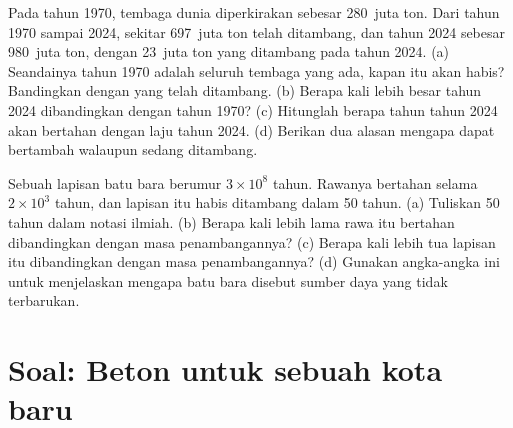 \begin{exercise}[$\star\star\star$]\label{exo:g9:earth-resources:11}
Pada tahun 1970,  tembaga dunia diperkirakan sebesar 280~juta ton.
Dari tahun 1970 sampai 2024, sekitar 697~juta ton telah ditambang, dan
 tahun 2024 sebesar 980~juta ton, dengan 23~juta ton yang
ditambang pada tahun 2024. (a) Seandainya  tahun 1970 adalah
seluruh tembaga yang ada, kapan  itu akan habis? Bandingkan
dengan yang telah ditambang. (b) Berapa kali lebih besar  tahun
2024 dibandingkan dengan  tahun 1970? (c) Hitunglah berapa tahun
 tahun 2024 akan bertahan dengan laju tahun 2024. (d) Berikan dua
alasan mengapa  dapat bertambah walaupun sedang ditambang.
\end{exercise}

\begin{exercise}[$\star\star\star$]\label{exo:g9:earth-resources:12}
Sebuah lapisan batu bara berumur $3 \times 10^8$ tahun. Rawanya bertahan
selama $2 \times 10^3$ tahun, dan lapisan itu habis ditambang dalam 50
tahun. (a) Tuliskan 50 tahun dalam notasi ilmiah. (b) Berapa kali lebih
lama rawa itu bertahan dibandingkan dengan masa penambangannya? (c) Berapa
kali lebih tua lapisan itu dibandingkan dengan masa penambangannya?
(d) Gunakan angka-angka ini untuk menjelaskan mengapa batu bara disebut
sumber daya yang tidak terbarukan.
\end{exercise}

\section{Soal: Beton untuk sebuah kota baru}

